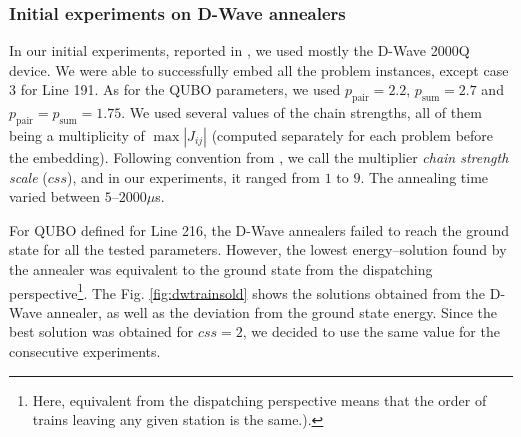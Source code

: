 \subsubsection{Initial experiments on D-Wave annealers}
In our initial experiments, reported in \cite{railwaydispatching}, we used
mostly the D-Wave 2000Q device. We were able to successfully embed all the
problem instances, except case 3 for Line 191. As for the QUBO parameters, we
used $p_{\text{pair}}=2.2$, $p_{\text{sum}}=2.7$ and
$p_{\text{pair}}=p_{\text{sum}}=1.75$. We used several values of the chain
strengths, all of them being a multiplicity of $\max|J_{ij}|$ (computed
separately for each problem before the embedding). Following convention from
\cite{railwaydispatching}, we call the multiplier \emph{chain strength scale}
($css$), and in our experiments, it ranged from $1$ to $9$. The annealing time
varied between $5$--$2000\mu$s.

For QUBO defined for Line 216, the D-Wave annealers failed to reach the ground
state for all the tested parameters. However, the lowest energy--solution found
by the annealer was equivalent to the ground state from the dispatching
perspective\footnote{Here, equivalent from the dispatching perspective means
  that the order of trains leaving any given station is the same.).}. The Fig.
\ref{fig:dwtrainsold} shows the solutions obtained from the D-Wave annealer, as
well as the deviation from the ground state energy. Since the best solution was
obtained for $css=2$, we decided to use the same value for the consecutive
experiments.


